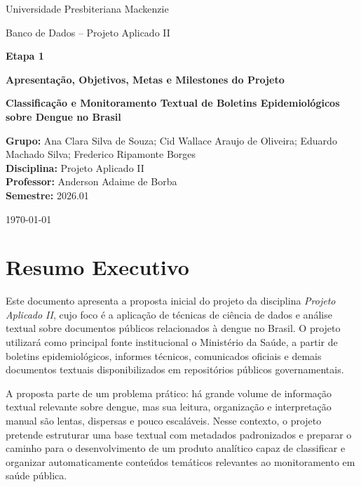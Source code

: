 \documentclass[12pt,a4paper]{article}
\begin{document}
\hypersetup{pageanchor=false}

\begin{titlepage}
    \centering
    {\large Universidade Presbiteriana Mackenzie \par}
    \vspace{0.4cm}
    {\large Banco de Dados – Projeto Aplicado II \par}
    \vspace{2.0cm}
    {\Large \textbf{Etapa 1} \par}
    \vspace{0.4cm}
    {\large \textbf{Apresentação, Objetivos, Metas e Milestones do Projeto} \par}
    \vspace{1.4cm}
    {\Large \textbf{Classificação e Monitoramento Textual de Boletins Epidemiológicos sobre Dengue no Brasil} \par}
    \vfill

    \begin{flushleft}
    \textbf{Grupo:} Ana Clara Silva de Souza; Cid Wallace Araujo de Oliveira; Eduardo Machado Silva; Frederico Ripamonte Borges \\
    \textbf{Disciplina:} Projeto Aplicado II \\
    \textbf{Professor:} Anderson Adaime de Borba \\
    \textbf{Semestre:} 2026.01
    \end{flushleft}

    \vfill
    {\large \today \par}
\end{titlepage}

\clearpage
\hypersetup{pageanchor=true}
\setcounter{page}{1}

\section*{Resumo Executivo}

Este documento apresenta a proposta inicial do projeto da disciplina \textit{Projeto Aplicado II}, cujo foco é a aplicação de técnicas de ciência de dados e análise textual sobre documentos públicos relacionados à dengue no Brasil. O projeto utilizará como principal fonte institucional o Ministério da Saúde, a partir de boletins epidemiológicos, informes técnicos, comunicados oficiais e demais documentos textuais disponibilizados em repositórios públicos governamentais.

A proposta parte de um problema prático: há grande volume de informação textual relevante sobre dengue, mas sua leitura, organização e interpretação manual são lentas, dispersas e pouco escaláveis. Nesse contexto, o projeto pretende estruturar uma base textual com metadados padronizados e preparar o caminho para o desenvolvimento de um produto analítico capaz de classificar e organizar automaticamente conteúdos temáticos relevantes ao monitoramento em saúde pública.
\end{document}
